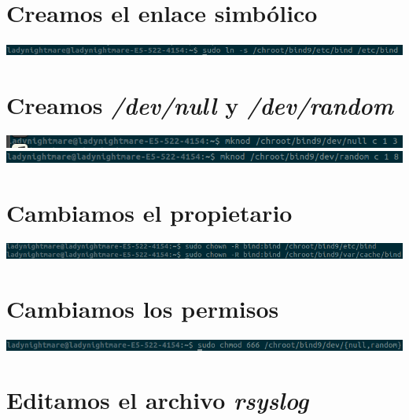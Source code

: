 \documentclass{article}
\begin{document}
\section{Creamos el enlace simbólico}

\begin{center}
	\includegraphics[scale=0.5]{link.png} 
\end{center}

\section{Creamos \textit{/dev/null} y \textit{/dev/random}}

\begin{center}
	\includegraphics[scale=0.5]{mknod1.png} 
	\includegraphics[scale=0.5]{mknod2.png} 
\end{center}

\section{Cambiamos el propietario}

\begin{center}
	\includegraphics[scale=0.5]{chown.png} 
\end{center}

\section{Cambiamos los permisos}

\begin{center}
	\includegraphics[scale=0.5]{chmod.png} 
\end{center}

\section{Editamos el archivo \textit{rsyslog}}
\end{document}
